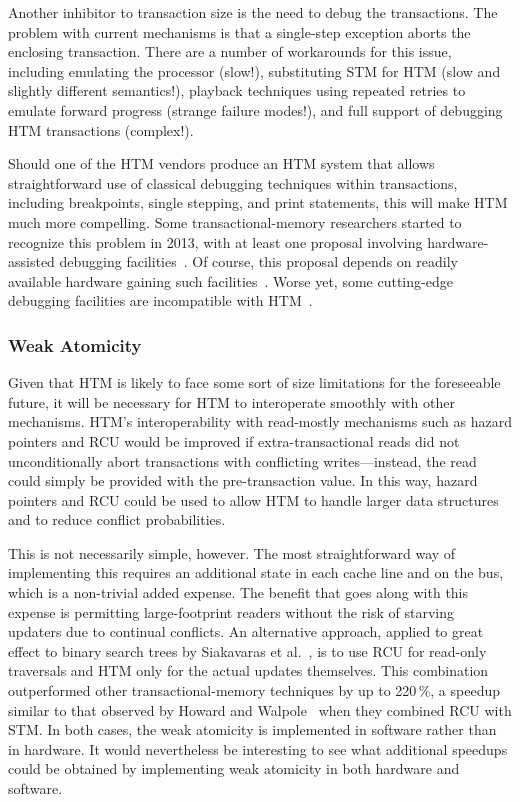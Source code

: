 Another inhibitor to transaction size is the need to debug the transactions.
The problem with current mechanisms is that a single-step exception
aborts the enclosing transaction.
There are a number of workarounds for this issue, including emulating
the processor (slow!), substituting STM for HTM (slow and slightly
different semantics!),
playback techniques using repeated retries to emulate forward
progress (strange failure modes!), and
full support of debugging HTM transactions (complex!).

Should one of the HTM vendors produce an HTM system that allows
straightforward use of classical debugging techniques within
transactions, including breakpoints, single stepping, and
print statements, this will make HTM much more compelling.
Some transactional-memory researchers started to recognize this
problem in 2013, with at least one proposal involving hardware-assisted
debugging facilities~\cite{JustinGottschlich2013TMdebug}.
Of course, this proposal depends on readily available hardware gaining such
facilities~\cite{TimothyHayes2020ARM-HTM,Intel2020TSXdevguide}.
Worse yet, some cutting-edge debugging facilities are incompatible
with HTM~\cite{RobertOCallahan2020DebuggingHTM}.

\subsubsection{Weak Atomicity}
\label{sec:future:Weak Atomicity}

Given that HTM is likely to face some sort of size limitations for the
foreseeable future, it will be necessary for HTM to interoperate
smoothly with other mechanisms.
HTM's interoperability with read-mostly mechanisms such as hazard pointers
and RCU would be improved if extra-transactional reads did not
unconditionally abort transactions with conflicting writes---instead,
the read could simply be provided with the pre-transaction value.
In this way, hazard pointers and RCU could be used to allow HTM to handle
larger data structures and to reduce conflict probabilities.

This is not necessarily simple, however.
The most straightforward way of implementing this requires an additional
state in each cache line and on the bus, which is a non-trivial added
expense.
The benefit that goes along with this expense is permitting
large-footprint readers without the risk of starving updaters due
to continual conflicts.
An alternative approach, applied to great effect to binary search trees
by Siakavaras et al.~\cite{Siakavaras2017CombiningHA},
is to use RCU for read-only traversals and HTM
only for the actual updates themselves.
This combination outperformed other transactional-memory techniques by
up to 220\,\%, a speedup similar to that observed by
Howard and Walpole~\cite{PhilHoward2011RCUTMRBTree}
when they combined RCU with STM\@.
In both cases, the weak atomicity is implemented in software rather than
in hardware.
It would nevertheless be interesting to see what additional speedups
could be obtained by implementing weak atomicity in both hardware and
software.

